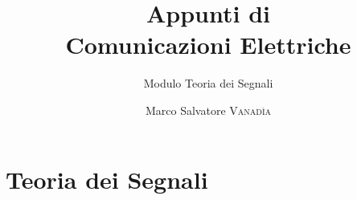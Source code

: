\documentclass[10pt,a4paper,onecolumn,titlepage,twoside,openright,final]{book}
\title{Appunti di \\ Comunicazioni Elettriche}
\subtitle{Modulo Teoria dei Segnali}
\author{Marco Salvatore \textsc{Vanadìa}}
\begin{document}
\frontmatter
\maketitle

\cleardoublepage\clearpage{\pagestyle{empty}\cleardoublepage}
\tableofcontents

\mainmatter

\part{Teoria dei Segnali}


{}

\printindex

%
\end{document}
